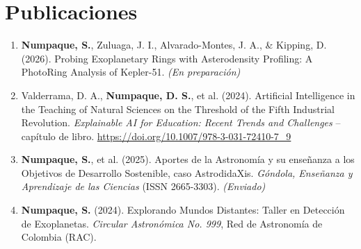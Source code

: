\section*{Publicaciones}
\begin{enumerate}
    \item \textbf{Numpaque, S.}, Zuluaga, J. I., Alvarado-Montes, J. A., \& Kipping, D. (2026). Probing Exoplanetary Rings with Asterodensity Profiling: A PhotoRing Analysis of Kepler-51. \textit{(En preparación)}
    \item Valderrama, D. A., \textbf{Numpaque, D. S.}, et al. (2024). Artificial Intelligence in the Teaching of Natural Sciences on the Threshold of the Fifth Industrial Revolution. \textit{Explainable AI for Education: Recent Trends and Challenges} -- capítulo de libro. \url{https://doi.org/10.1007/978-3-031-72410-7_9}
    \item \textbf{Numpaque, S.}, et al. (2025). Aportes de la Astronomía y su enseñanza a los Objetivos de Desarrollo Sostenible, caso AstrodidaXis. \textit{Góndola, Enseñanza y Aprendizaje de las Ciencias} (ISSN 2665-3303). \textit{(Enviado)}
    \item \textbf{Numpaque, S.} (2024). Explorando Mundos Distantes: Taller en Detección de Exoplanetas. \textit{Circular Astronómica No. 999}, Red de Astronomía de Colombia (RAC).
\end{enumerate}
